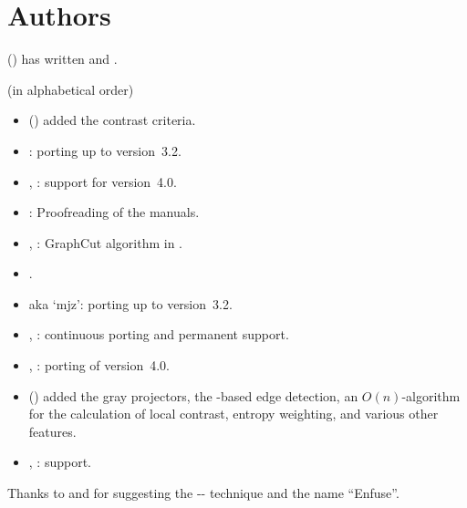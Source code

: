 

\chapter[Authors\commonpart]{\label{sec:authors}Authors\commonpart}

 () has written
 and .

\bigskip
\noindent
{} (in alphabetical order)

\begin{itemize}
\item
   () added the contrast
  criteria.

\item
  :  porting up to version~3.2.

\item
  , : 
  support for version~4.0.

\item
  : Proofreading of the manuals.

\item
  , : GraphCut
  algorithm in .

\item
  .

\item
   aka `mjz':  porting up to version~3.2.

\item
  , : continuous
   porting and permanent  support.

\item
  , : 
  porting of version~4.0.

\item
   () added the gray
  projectors, the -based edge detection, an $O(n)$-algorithm for the calculation of
  local contrast, entropy weighting, and various other features.

\item
  , : 
  support.
\end{itemize}

Thanks to  and  for suggesting the
-- technique and the name
``Enfuse''.


